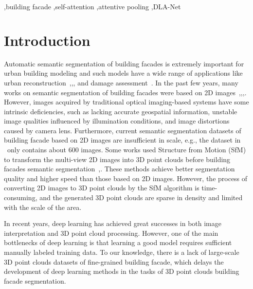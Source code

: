 \documentclass[review]{elsarticle}
\begin{document}
\begin{frontmatter}
\begin{abstract}
\end{abstract}

\begin{keyword}
	 \sep{building facade}  \sep {self-attention} \sep {attentive pooling} \sep{DLA-Net}	
\end{keyword}

\end{frontmatter}


\section{Introduction}

Automatic semantic segmentation of building facades is extremely important for urban building modeling and such models have a wide range of applications like urban reconstruction~\cite{Sampath2010},\cite{zhang2013layered},\cite{zhang2012tensor},\cite{zhang2013perception} and damage assessment~\cite{Nia2018}.
In the past few years, many works on semantic segmentation of building facades were based on 2D images~\cite{yang2012parsing},\cite{dai2012learning},\cite{martinovic2012three},\cite{tylevcek2013spatial}. However, images acquired by traditional optical imaging-based systems have some intrinsic deficiencies, such as lacking accurate geospatial information, unstable image qualities influenced by illumination conditions, and image distortions caused by camera lens. Furthermore, current semantic segmentation datasets of building facade based on 2D images are insufficient in scale, e.g., the dataset in \cite{tylevcek2013spatial}~only contains about 600 images. Some works used Structure from Motion (SfM) to transform the multi-view 2D images into 3D point clouds before building facades semantic segmentation~\cite{riemenschneider2014learning},\cite{martinovic20153d}. These methods achieve better segmentation quality and higher speed than those based on 2D images. However, the process of converting 2D images to 3D point clouds by the SfM algorithm is time-consuming, and the generated 3D point clouds are sparse in density and limited with the scale of the area.

In recent years, deep learning has achieved great successes in both image interpretation and 3D point cloud processing. However, one of the main bottlenecks of deep learning is that learning a good model requires sufficient manually labeled training data. To our knowledge, there is a lack of large-scale 3D point clouds datasets of fine-grained building facade, which delays the development of deep learning methods in the tasks of 3D point clouds building facade segmentation.
\end{document}
